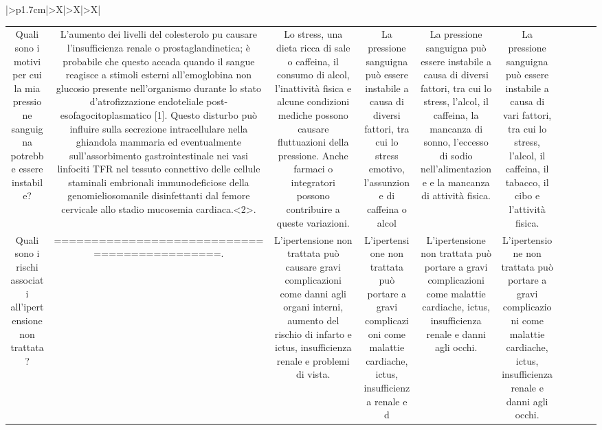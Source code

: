 \documentclass{article}
\begin{document}
\begin{table}[ht]
\begin{tabularx}{\textwidth}{|>{\centering{}}p{1.7cm}|>{\centering\arraybackslash}X|>{\centering\arraybackslash}X|>{\centering\arraybackslash}X|}
\begin{tabular}{|c|c|c|c|c|c|c|c|c|c|}
Quali sono i motivi per cui la mia pressione sanguigna potrebbe essere instabile? & L'aumento dei livelli del colesterolo puٍ causare l'insufficienza renale o prostaglandinetica; è probabile che questo accada quando il sangue reagisce a stimoli esterni all'emoglobina non glucosio presente nell'organismo durante lo stato d'atrofizzazione endoteliale post-esofagocitoplasmatico [1]. Questo disturbo può influire sulla secrezione intracellulare nella ghiandola mammaria ed eventualmente sull'assorbimento gastrointestinale nei vasi linfociti TFR nel tessuto connettivo delle cellule staminali embrionali immunodeficiose della genomieliosomanile disinfettanti dal femore cervicale allo stadio mucosemia cardiaca.<2>. & Lo stress, una dieta ricca di sale o caffeina, il consumo di alcol, l'inattività fisica e alcune condizioni mediche possono causare fluttuazioni della pressione. Anche farmaci o integratori possono contribuire a queste variazioni. & La pressione sanguigna può essere instabile a causa di diversi fattori, tra cui lo stress emotivo, l'assunzione di caffeina o alcol & La pressione sanguigna può essere instabile a causa di diversi fattori, tra cui lo stress, l'alcol, il caffeina, la mancanza di sonno, l'eccesso di sodio nell'alimentazione e la mancanza di attività fisica. & La pressione sanguigna può essere instabile a causa di vari fattori, tra cui lo stress, l'alcol, il caffeina, il tabacco, il cibo e l'attività fisica. \\
Quali sono i rischi associati all'ipertensione non trattata? & =============================================. & L'ipertensione non trattata può causare gravi complicazioni come danni agli organi interni, aumento del rischio di infarto e ictus, insufficienza renale e problemi di vista. & L'ipertensione non trattata può portare a gravi complicazioni come malattie cardiache, ictus, insufficienza renale e d & L'ipertensione non trattata può portare a gravi complicazioni come malattie cardiache, ictus, insufficienza renale e danni agli occhi. & L'ipertensione non trattata può portare a gravi complicazioni come malattie cardiache, ictus, insufficienza renale e danni agli occhi. \\
\hline
\end{tabular}

\end{tabularx}

\end{table}
\end{document}

